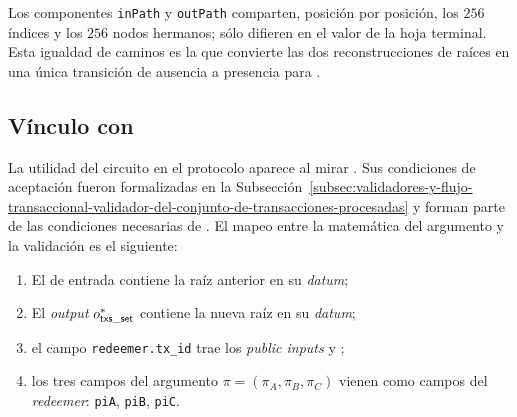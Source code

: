 Los componentes \texttt{inPath} y \texttt{outPath} comparten, posición por posición, los $256$ índices y los $256$ nodos hermanos; sólo difieren en el valor de la hoja terminal. Esta igualdad de caminos es la que convierte las dos reconstrucciones de raíces en una única transición de ausencia a presencia para \TxId.

\subsection{Vínculo con \TxsUpdaterMintingValidator}
\label{subsec:tx-set-update-vinculo-con-txsupdatermintingvalidator}

La utilidad del circuito en el protocolo aparece al mirar \TxsUpdaterMintingValidator. Sus condiciones de aceptación fueron formalizadas en la Subsección~\ref{subsec:validadores-y-flujo-transaccional-validador-del-conjunto-de-transacciones-procesadas} y forman parte de las condiciones necesarias de \MintTx. El mapeo entre la matemática del argumento \Groth y la validación \Onchain es el siguiente:

\begin{enumerate}[noitemsep]
  \item El \UTxO \TxsUpdaterUTxO de entrada contiene la raíz anterior \RootIn en su \textit{datum};
  \item El \textit{output} $o_{\mathsf{txs\_set}}^*$ contiene la nueva raíz \RootOut en su \textit{datum};
  \item el campo \texttt{redeemer.tx\_id} trae los \textit{public inputs} \TxIdHi y \TxIdLo;
  \item los tres campos del argumento \Groth $\pi = (\pi_A, \pi_B, \pi_C)$ vienen como campos del \textit{redeemer}: \texttt{piA}, \texttt{piB}, \texttt{piC}.
\end{enumerate}
